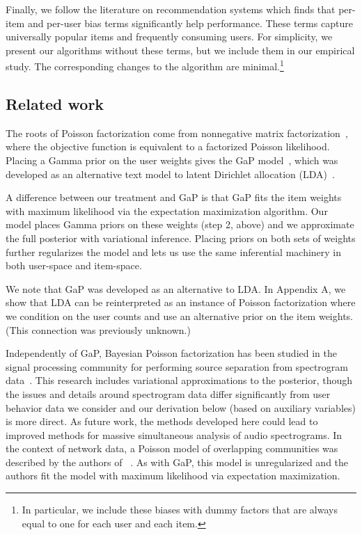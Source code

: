 \documentclass{sig-alternate}
\begin{document}
Finally, we follow the literature on recommendation systems which
finds that per-item and per-user bias terms significantly help
performance. These terms capture universally popular items and
frequently consuming users.  For simplicity, we present our algorithms
without these terms, but we include them in our empirical study. The
corresponding changes to the algorithm are minimal.\footnote{In
particular, we include these biases with dummy factors that are always
equal to one for each user and each item.}

\subsection{Related work}

The roots of Poisson factorization come from nonnegative matrix
factorization~\cite{Lee:1999}, where the objective function is
equivalent to a factorized Poisson likelihood.  Placing a Gamma prior
on the user weights gives the GaP model~\cite{Canny:2004}, which was
developed as an alternative text model to latent Dirichlet allocation
(LDA)~\cite{Blei:2003b}.

A difference between our treatment and GaP is that GaP fits the item
weights with maximum likelihood via the expectation maximization
algorithm.  Our model places Gamma priors on these weights (step 2,
above) and we approximate the full posterior with variational
inference.  Placing priors on both sets of weights further regularizes
the model and lets us use the same inferential machinery in both
user-space and item-space.  


We note that GaP was developed as an alternative to LDA. In Appendix
A, we show that LDA can be reinterpreted as an instance of Poisson
factorization where we condition on the user counts and use an
alternative prior on the item weights.  (This connection was
previously unknown.)

Independently of GaP, Bayesian Poisson factorization has been studied
in the signal processing community for performing source separation
from spectrogram data~\cite{Cemgil:2009,Hoffman:2012}.  This research
includes variational approximations to the posterior, though the
issues and details around spectrogram data differ significantly from
user behavior data we consider and our derivation below (based on
auxiliary variables) is more direct.  As future work, the methods
developed here could lead to improved methods for massive simultaneous
analysis of audio spectrograms. In the context of network data, a
Poisson model of overlapping communities was described by the authors
of ~\cite{Ball:2011}. As with GaP, this model is unregularized and the
authors fit the model with maximum likelihood via expectation
maximization.
\end{document}
